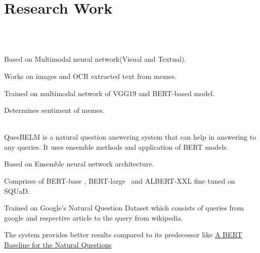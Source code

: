 \documentclass[]{deedy-resume-openfont}
\begin{document}
\hfill
\begin{minipage}[t]{0.66\textwidth} 


\section{Research Work}



\\
\\
\vspace{\topsep}
\begin{tightemize}
\item Based on Multimodal neural network(Visual and Textual). \\
\item Works on images and OCR extracted text from memes. \\
\item Trained on multimodal network of VGG19 and BERT-based model. \\
\item Determines sentiment of memes. \\
\end{tightemize}
\sectionsep

\\
QuesBELM is a natural question answering system that can help in answering to any queries. It uses ensemble methods and application of BERT models. \\
\begin{tightemize}
\item Based on Ensemble neural network architecture. \\
\item Comprises of BERT-base , BERT-large \ and ALBERT-XXL fine tuned on SQUaD. \\
\item Trained on Google's Natural Question Dataset which consists of queries from google and respective article to the query from wikipedia. \\
\item The system provides better results compared to its predecessor like \href{https://arxiv.org/pdf/1901.08634.pdf}{{A BERT Baseline for the Natural Questions}}
\end{tightemize}
\sectionsep




\end{minipage}
\end{document}
